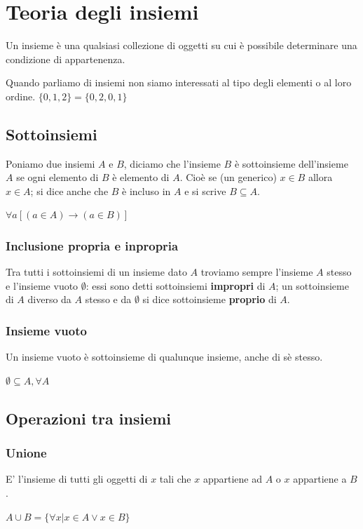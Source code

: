 \chapter{Teoria degli insiemi}

\begin{definition}[Insiemi]
Un insieme è una qualsiasi collezione di oggetti su cui è possibile determinare una condizione di appartenenza.
\end{definition}

Quando parliamo di insiemi non siamo interessati al tipo degli elementi o al loro ordine. $\{0,1,2\} = \{0,2,0,1\}$

\section{Sottoinsiemi}
\begin{definition}[Sottoinsiemi]
    Poniamo due insiemi $A$ e $B$, diciamo che l’insieme $B$ è sottoinsieme dell’insieme $A$ se ogni elemento di $B$ è elemento di $A$.
    Cioè se (un generico) $x\in B$ allora $x\in A$; si dice anche che $B$ è incluso in $A$ e si scrive $B\subseteq A$.\begin{center}$\forall a[(a\in A)\rightarrow(a\in B)]$\end{center}
\end{definition}

\subsection*{Inclusione propria e inpropria}
    Tra tutti i sottoinsiemi di un insieme dato $A$ troviamo sempre l’insieme $A$ stesso e l’insieme vuoto $\emptyset$: essi sono detti sottoinsiemi \textbf{impropri} di $A$; un sottoinsieme di $A$ diverso da $A$ stesso e da $\emptyset$ si dice sottoinsieme \textbf{proprio} di $A$.

\subsection*{Insieme vuoto}
    Un insieme vuoto è sottoinsieme di qualunque insieme, anche di sè stesso.\begin{center}$\emptyset \subseteq A, \forall A$\end{center}

\section{Operazioni tra insiemi}
\subsection*{Unione}
    E' l'insieme di tutti gli oggetti di $x$ tali che $x$ appartiene ad $A$ o $x$ appartiene a $B$.\begin{center}$A\cup B = \{\forall x|x\in A \vee x\in B\}$\end{center}

